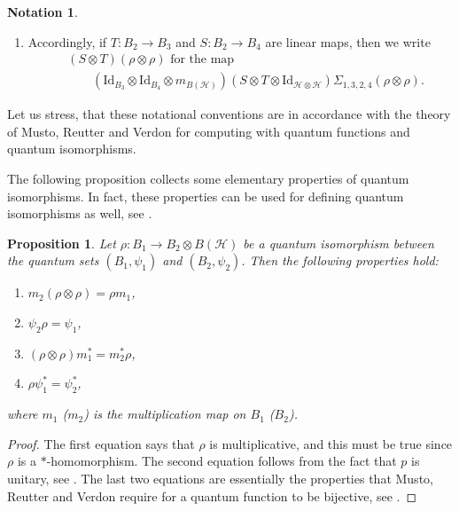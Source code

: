 \documentclass{amsart}
\newtheorem{proposition}[thm]{Proposition}
\theoremstyle{definition}
\newtheorem{notation}[thm]{Notation}
\theoremstyle{definition}
\begin{document}
\begin{notation}
\begin{enumerate}
        \item Accordingly, if $T: B_2 \to B_3$ and $S: B_2 \to B_4$ are linear maps, then we write
        \begin{align*}
            &(S \otimes T)(\rho \otimes \rho)
            \text{ for the map } \\
            &\qquad (\mathrm{Id}_{B_3} \otimes \mathrm{Id}_{B_4} \otimes m_{B(\mathcal{H})}) (S \otimes T \otimes \mathrm{Id}_{\mathcal{H} \otimes \mathcal{H}}) \Sigma_{1, 3, 2, 4} (\rho \otimes \rho).
        \end{align*}
    \end{enumerate}
    Let us stress, that these notational conventions are in accordance with the theory of Musto, Reutter and Verdon for computing with quantum functions and quantum isomorphisms.
\end{notation}

The following proposition collects some elementary properties of quantum isomorphisms. In fact, these properties can be used for defining quantum isomorphisms as well, see \cite[Theorem 4.8]{musto_compositional_2018}.

\begin{proposition}
    \label{pre::prop:properties_of_qisomorphisms}
    Let $\rho: B_1 \to B_2 \otimes B(\mathcal{H})$ be a quantum isomorphism between the quantum sets $(B_1, \psi_1)$ and $(B_2, \psi_2)$. Then the following properties hold:
    \begin{enumerate}
        \item $m_2(\rho \otimes \rho) = \rho m_1$,
        \item $\psi_2 \rho = \psi_1$,
        \item $(\rho \otimes \rho) m_1^\ast = m_2^\ast \rho$,
        \item $\rho \psi_1^\ast = \psi_2^\ast$,
    \end{enumerate}
    where $m_1$ ($m_2$) is the multiplication map on $B_1$ ($B_2$).
\end{proposition}

\begin{proof}
    The first equation says that $\rho$ is multiplicative, and this must be true since $\rho$ is a $\ast$-homomorphism. The second equation follows from the fact that $p$ is unitary, see \cite[Lemma 4.2]{brannan_bigalois_2020}. The last two equations are essentially the properties that Musto, Reutter and Verdon require for a quantum function to be bijective, see \cite[Theorem 4.8]{musto_compositional_2018}.
\end{proof}
\end{document}
